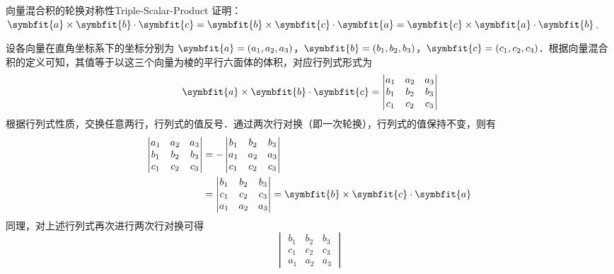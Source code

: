 \begin{problem}{向量混合积的轮换对称性}{Triple-Scalar-Product}
    证明：$\symbfit{a} \times \symbfit{b} \cdot \symbfit{c} = \symbfit{b} \times \symbfit{c} \cdot \symbfit{a} = \symbfit{c} \times \symbfit{a} \cdot \symbfit{b}$.
\end{problem}

\begin{myproof}
    设各向量在直角坐标系下的坐标分别为 $\symbfit{a} = (a_1, a_2, a_3)$，$\symbfit{b} = (b_1, b_2, b_3)$，$\symbfit{c} = (c_1, c_2, c_3)$．根据向量混合积的定义可知，其值等于以这三个向量为棱的平行六面体的体积，对应行列式形式为
    \begin{equation}
        \symbfit{a} \times \symbfit{b} \cdot \symbfit{c} = \begin{vmatrix} a_1 & a_2 & a_3 \\ b_1 & b_2 & b_3 \\ c_1 & c_2 & c_3 \end{vmatrix}
    \end{equation}
    根据行列式性质，交换任意两行，行列式的值反号．通过两次行对换（即一次轮换），行列式的值保持不变，则有
    \begin{equation}
        \begin{aligned}
            \begin{vmatrix} a_1 & a_2 & a_3 \\ b_1 & b_2 & b_3 \\ c_1 & c_2 & c_3 \end{vmatrix}
             & = - \begin{vmatrix} b_1 & b_2 & b_3 \\ a_1 & a_2 & a_3 \\ c_1 & c_2 & c_3 \end{vmatrix}                                                  \\
             & = \begin{vmatrix} b_1 & b_2 & b_3 \\ c_1 & c_2 & c_3 \\ a_1 & a_2 & a_3 \end{vmatrix} = \symbfit{b} \times \symbfit{c} \cdot \symbfit{a}
        \end{aligned}
    \end{equation}
    同理，对上述行列式再次进行两次行对换可得
    \begin{equation}
        \begin{vmatrix} b_1 & b_2 & b_3 \\ c_1 & c_2 & c_3 \\ a_1 & a_2 & a_3 \end{vmatrix}

\end{equation}
\end{myproof}

